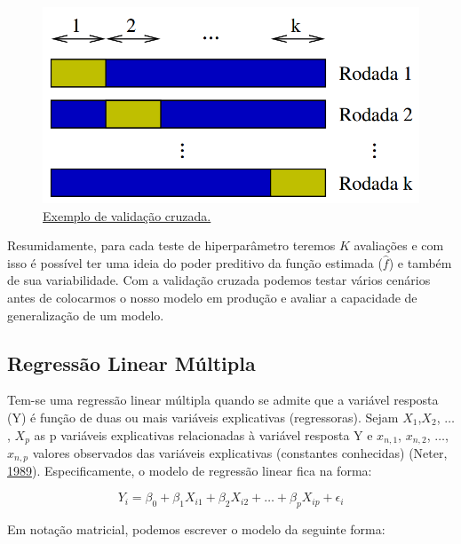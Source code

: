 \documentclass[
	12pt,				%
	a4paper,		%
	oneside,    %
	chapter=TITLE,		   %
	section=TITLE,		   %
	subsection=TITLE,	   %
	subsubsection=TITLE, %
	english,			%
	french,				%
	spanish,			%
	brazil,				%
]{abntex2}
\begin{document}
\begin{figure}
\centering
\includegraphics[width=\textwidth,height=0.4\textheight]{../fig/kfold.png}
\caption{\href{https://pt.stackoverflow.com/questions/66777/d\%C3\%BAvidas-na-utiliza\%C3\%A7\%C3\%A3o-de-stratified-k-fold-no-scikit-learn}{Exemplo
de validação cruzada.\label{img:kfold}}}
\end{figure}

Resumidamente, para cada teste de hiperparâmetro teremos \(K\)
avaliações e com isso é possível ter uma ideia do poder preditivo da
função estimada (\(\hat{f}\)) e também de sua variabilidade. Com a
validação cruzada podemos testar vários cenários antes de colocarmos o
nosso modelo em produção e avaliar a capacidade de generalização de um
modelo.

\hypertarget{regressuxe3o-linear-muxfaltipla}{%
\subsection{Regressão Linear
Múltipla}\label{regressuxe3o-linear-muxfaltipla}}

Tem-se uma regressão linear múltipla quando se admite que a variável
resposta (Y) é função de duas ou mais variáveis explicativas
(regressoras). Sejam \(X_1\),\(X_2\), \(\dots\) , \(X_p\) as p variáveis
explicativas relacionadas à variável resposta Y e \(x_{n,1}\),
\(x_{n,2}\), \(\dots\), \(x_{n,p}\) valores observados das variáveis
explicativas (constantes conhecidas) (Neter,
\protect\hyperlink{ref-neter1989applied}{1989}). Especificamente, o
modelo de regressão linear fica na forma:

\[
Y_i = \beta_0 + \beta_1 X_{i1} + \beta_2 X_{i2}+\dots + \beta_p X_{ip} + \epsilon_i
\]

Em notação matricial, podemos escrever o modelo da seguinte forma:
\end{document}
